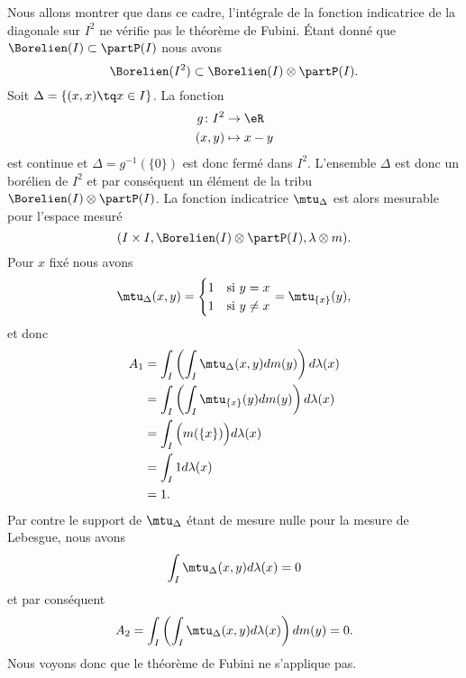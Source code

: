 \begin{example}
    Nous allons montrer que dans ce cadre, l'intégrale de la fonction indicatrice de la diagonale sur \( I^2\) ne vérifie pas le théorème de Fubini. Étant donné que \( \Borelien(I)\subset\partP(I)\) nous avons
    \begin{equation}
        \Borelien(I^2)\subset\Borelien(I)\otimes\partP(I).
    \end{equation}
    Soit \( \Delta=\{ (x,x)\tq x\in I \}\). La fonction
    \begin{equation}
        \begin{aligned}
            g\colon I^2&\to \eR \\
            (x,y)&\mapsto x-y 
        \end{aligned}
    \end{equation}
    est continue et \( \Delta=g^{-1}(\{ 0 \})\) est donc fermé dans \( I^2\). L'ensemble \( \Delta\) est donc un borélien de \( I^2\) et par conséquent un élément de la tribu \( \Borelien(I)\otimes\partP(I)\). La fonction indicatrice \( \mtu_{\Delta}\) est alors mesurable pour l'espace mesuré
    \begin{equation}
        (I\times I,\Borelien(I)\otimes\partP(I),\lambda\otimes m).
    \end{equation}
    Pour \( x\) fixé nous avons
    \begin{equation}
        \mtu_{\Delta}(x,y)=\begin{cases}
            1    &   \text{si \( y= x\)}\\
            1    &    \text{si \( y\neq x\)}
        \end{cases}=\mtu_{\{ x \}}(y),
    \end{equation}
    et donc
    \begin{subequations}
        \begin{align}
            A_1&=\int_I\left( \int_I\mtu_{\Delta}(x,y)dm(y) \right)d\lambda(x)\\
            &=\int_I\left( \int_I\mtu_{\{ x \}}(y)dm(y) \right)d\lambda(x)\\
            &=\int_I\Big( m(\{ x \}) \Big)d\lambda(x)\\
            &=\int_I 1d\lambda(x)\\
            &=1.
        \end{align}
    \end{subequations}
    Par contre le support de \( \mtu_{\Delta}\) étant de mesure nulle pour la mesure de Lebesgue, nous avons
    \begin{equation}
        \int_I\mtu_{\Delta}(x,y)d\lambda(x)=0
    \end{equation}
    et par conséquent
    \begin{equation}
        A_2=\int_I\left( \int_I\mtu_{\Delta}(x,y)d\lambda(x) \right)dm(y)=0.
    \end{equation}
    Nous voyons donc que le théorème de Fubini ne s'applique pas.
\end{example}

